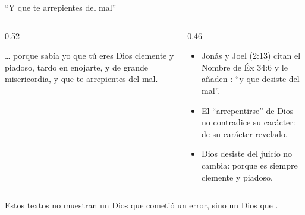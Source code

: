 \begin{frame}{``Y que te arrepientes del mal''}
\begin{columns}[t,onlytextwidth]
\begin{column}{0.52\textwidth}
\begin{cita}\ldots{} porque sabía yo que tú eres Dios clemente y piadoso, tardo en enojarte, y de grande misericordia, y que te arrepientes del mal.\end{cita}
\begin{center}\\[2pt]\end{center}
\end{column}
\begin{column}{0.46\textwidth}\small
\begin{itemize}
\item Jonás y Joel (2:13) citan el Nombre de Éx 34:6 y le añaden : ``y que desiste del mal''.
\item El ``arrepentirse'' de Dios no contradice su carácter:  de su carácter revelado.
\item Dios desiste del juicio  no cambia: porque es siempre clemente y piadoso.
\end{itemize}
\end{column}
\end{columns}\par\smallskip
\begin{tcolorbox}[colback=papiro,colframe=dorado,boxrule=1.2pt,arc=3pt]
\small Estos textos no muestran un Dios que cometió un error, sino un Dios que .
\end{tcolorbox}
\end{frame}

